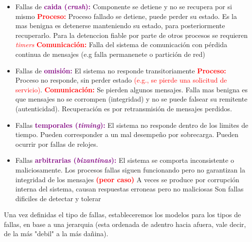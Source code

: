 \begin{itemize}
    \item Fallas de \textcolor{purple}{\textbf{caida (\textit{crash}):}} Componente se detiene y no se recupera por si mismo
    \subitem \textcolor{red}{\textbf{Proceso:}} Proceso fallado se detiene, puede perder su estado. Es la mas benigna es detenerse manteniendo su estado, para posteriormente recuperarlo. Para la detenccion fiable por parte de otros procesos se requieren \textcolor{red}{\textit{timers}}
    \subitem \textcolor{red}{\textbf{Comunicación:}} Falla del sistema de comunicación con pérdida continua de mensajes (e.g falla permanenete o partición de red)

    \item Fallas de \textcolor{purple}{\textbf{omisión:}} El sistema no responde transitoriamente
    \subitem \textcolor{red}{\textbf{Proceso:}} Proceso no responde, sin perder estado \textcolor{red}{(e.g., se pierde una solicitud de servicio)}.
    \subitem \textcolor{red}{\textbf{Comunicación:}} Se pierden algunos mensajes. Falla mas benigna es que mensajes no se corrompen (integridad) y no se puede falsear su
    remitente (autenticidad). Recuperación es por retransmisión de mensajes perdidos.

    \item Fallas \textcolor{purple}{\textbf{temporales (\textit{timing}):}} El sistema no responde dentro de los limites de tiempo.
    \subitem Pueden corresponder a un mal desempeño por sobrecarga. 
    \subitem Pueden ocurrir por fallas de relojes.

    \item Fallas \textcolor{purple}{\textbf{arbitrarias (\textit{bizantinas}):}} El sistema se comporta inconsistente o maliciosamente.
    \subitem Los procesos fallas siguen funcionando pero no garantizan la integridad de los mensajes \textcolor{red}{\textbf{(peor caso)}}
    \subitem A veces se produce por corrupción interna del sistema, causan respuestas erroneas pero no maliciosas
    \subitem Son fallas dificiles de detectar y tolerar
\end{itemize}


Una vez definidas el tipo de fallas, estableceremos los modelos para los tipos de fallas, en base a una jerarquia (esta ordenada de adentro hacia afuera, vale decir, de la más "debil" a la más dañina).

